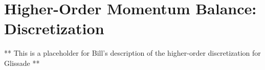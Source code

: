 
\section{Higher-Order Momentum Balance: Discretization}

** This is a placeholder for Bill's description of the higher-order discretization for Glissade **
